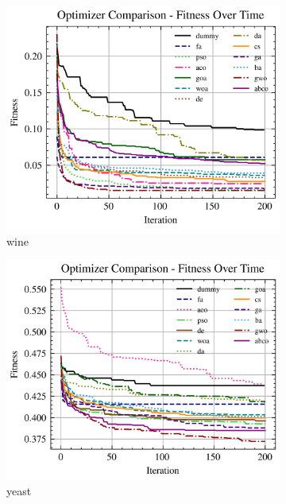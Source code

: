 \begin{figure}[htp]
\begin{subfigure}[htp]{0.45\textwidth}
        \includegraphics[width=\textwidth]{imagenes/fitness_charts/img/binary/wine/optimizers_fitness_knn.png}
        \caption{wine}
    \end{subfigure}
    \begin{subfigure}[htp]{0.45\textwidth}
        \includegraphics[width=\textwidth]{imagenes/fitness_charts/img/binary/yeast/optimizers_fitness_knn.png}
        \caption{yeast}
    \end{subfigure}
    \begin{subfigure}[htp]{0.45\textwidth}

\end{subfigure}
\end{figure}
